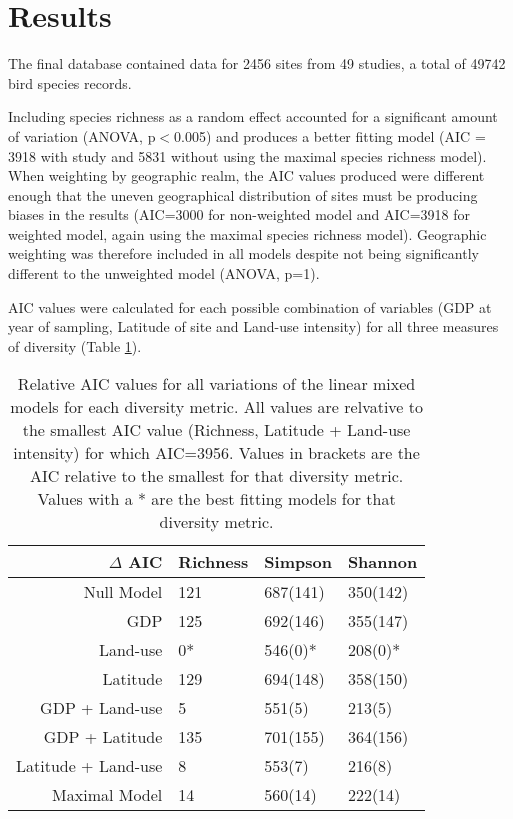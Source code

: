 \documentclass[11pt]{article}
\begin{document}
\section{Results}

The final database contained data for 2456 sites from 49 studies, a total of 49742 bird species records.

Including species richness as a random effect accounted for a significant amount of variation (ANOVA, p$<$0.005) and produces a better fitting model (AIC = 3918 with study and 5831 without using the maximal species richness model). When weighting by geographic realm, the AIC values produced were different enough that the uneven geographical distribution of sites must be producing biases in the results (AIC=3000 for non-weighted model and AIC=3918 for weighted model, again using the maximal species richness model). Geographic weighting was therefore included in all models despite not being significantly different to the unweighted model (ANOVA, p=1).

AIC values were calculated for each possible combination of variables (GDP at year of sampling, Latitude of site and Land-use intensity) for all three measures of diversity (Table \ref{table:AIC}).
\vfill
\begin{table}[ht]
\centering
\caption{Relative AIC values for all variations of the linear mixed models for each diversity metric. All values are relvative to the smallest AIC value (Richness, Latitude + Land-use intensity) for which AIC=3956. Values in brackets are the AIC relative to the smallest for that diversity metric. Values with a * are the best fitting models for that diversity metric.}
\begin{tabular}{rlll}
  \toprule
 $\Delta$ AIC & Richness & Simpson & Shannon \\ 
  \midrule
Null Model & 121 & 687(141) & 350(142) \\ 
  GDP & 125 & 692(146) & 355(147) \\ 
  Land-use & 0* & 546(0)* & 208(0)* \\ 
  Latitude & 129 & 694(148) & 358(150) \\ 
  GDP + Land-use & 5 & 551(5) & 213(5) \\ 
  GDP + Latitude & 135 & 701(155) & 364(156) \\ 
  Latitude + Land-use & 8 & 553(7) & 216(8) \\ 
  Maximal Model & 14 & 560(14) & 222(14) \\ 
   \bottomrule
\end{tabular}

\label{table:AIC}
\end{table}
\end{document}
